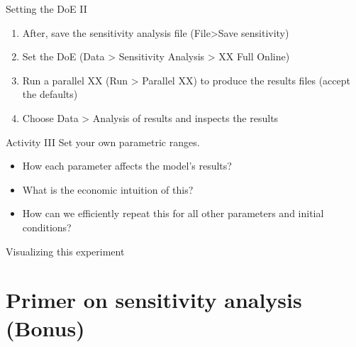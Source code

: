 \documentclass[bigger,aspectratio=169]{beamer}
\begin{document}
\begin{frame}[label={sec:orge9d80b2}]{Setting the DoE II}
\begin{enumerate}
\item After, save the sensitivity analysis file (\alert{File>Save sensitivity})
\item Set the DoE (\alert{Data > Sensitivity Analysis > XX Full Online})
\item Run a \alert{parallel XX} (Run > Parallel XX) to produce the results files (accept the defaults)
\item Choose \alert{Data > Analysis of results} and inspects the results
\end{enumerate}
\end{frame}
\begin{frame}[label={sec:orgec3f6bb}]{Activity III}
Set your own parametric ranges.

\begin{itemize}
\item How each parameter affects the model's results?
\item What is the economic intuition of this?
\item How can we efficiently repeat this for all other parameters and initial conditions?
\end{itemize}
\end{frame}
\begin{frame}[label={sec:org20f4e49}]{Visualizing this experiment}
\end{frame}
\section{Primer on sensitivity analysis (Bonus)}
\label{sec:org9324733}
\end{document}
